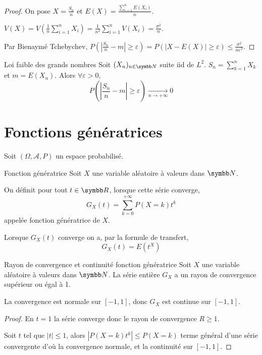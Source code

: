 \begin{proof}
    On pose $X = \frac{S_n}{n}$ et $\displaystyle E(X) = \frac{\sum_{i = 1 }^{n } E(X_i)} n$. 

    $\displaystyle V(X) = V\left( \frac 1 n \sum_{i = 1 }^{ n } X_i \right) = \frac 1 {n^2} \sum_{i = 1 }^{ n } V(X_i) = \frac{\sigma^2}{n}$.

    Par Bienaymé Tchebychev,
    $\displaystyle P\left( \left| \frac{S_n}{n} - m \right| \geqslant \varepsilon \right) = P(|X - E(X)| \geqslant \varepsilon) \leqslant \frac{\sigma^2}{n \varepsilon^2}$.
\end{proof}

\begin{proposition}{Loi faible des grands nombres}{}
    Soit $(X_n)_{n \in \N}$ suite iid de $L^2$. 
    $\displaystyle S_n = \sum_{k = 1 }^{ n } X_k$ et $m = E(X_n)$. Alors 
    $\forall \varepsilon > 0,$  $$P\left( \left| \frac{S_n}{n} - m \right| \geqslant \varepsilon \right) \xrightarrow[n \to + \infty]{} 0$$
\end{proposition}

\section{Fonctions génératrices }

Soit $(\Omega, \mathcal A, P)$ un espace probabilisé. 

\begin{definition}{Fonction génératrice}{}
    Soit $X$ une variable aléatoire à valeurs dans $\N$.

    On définit pour tout $t \in \R$, lorsque cette série converge, 
    $$ G_X(t) = \sum_{k = 0 }^{+\infty } P(X = k) t^k $$
    appelée fonction génératrice de $X$.

    Lorsque $G_X(t)$ converge on a, par la formule de transfert,
    $$ G_X(t) = E(t^X) $$
\end{definition}

\begin{theoreme}{Rayon de convergence et continuité fonction génératrice}{}
    Soit $X$ une variable aléatoire à valeurs dans $\N$. La série entière 
    $G_X$ a un rayon de convergence supérieur ou égal à 1. 

    La convergence est normale sur $[-1, 1]$, donc $G_X$ est continue sur $[-1, 1]$.
\end{theoreme}

\begin{proof}
    En $t = 1$ la série converge donc le rayon de convergence $R \geqslant 1$.

    Soit $t $ tel que $|t| \leqslant 1$, alors 
    $|P(X = k) t^k| \leqslant P(X = k)$ terme général d'une série convergente d'où la 
    convergence normale, et la continuité sur $[-1, 1]$.
\end{proof}

